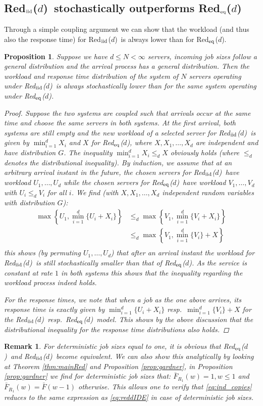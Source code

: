 \documentclass[12pt]{report}
\newcommand{\Redid}{Red$_{\textup{eq}}$($d$)}
\newcommand{\Redind}{Red$_{\textup{iid}}$($d$)}
\newtheorem{remark}{Remark}
\newtheorem{proposition}[theorem]{Proposition}
\begin{document}
\subsection{\Redind\ stochastically outperforms \Redid}
Through a simple coupling argument we can show that the workload (and thus also the response time) for \Redind\ is always lower than for \Redid .
\begin{proposition}
Suppose we have $d\leq N<\infty$ servers, incoming job sizes follow a general distribution and the arrival process has a general distribution. Then the workload and response time distribution of the system of $N$ servers operating under \Redind\ is always stochastically lower than for the same system operating under \Redid .
\begin{proof}
Suppose the two systems are coupled such that arrivals occur at the same time and choose the same servers in both systems. At the first arrival, both systems are still empty and the new workload of a selected server for \Redind\ is given by $\min_{i=1}^d X_i$ and $X$ for \Redid, where $X,X_1,\dots,X_d$ are independent and have distribution $G$. The inequality $\min_{i=1}^d X_i \leq_d X$ obviously holds (where $\leq_d$ denotes the distributional inequality). By induction, we assume that at an arbitrary arrival instant in the future, the chosen servers for \Redind\ have workload $U_1,\dots,U_d$ while the chosen servers for \Redid\ have workload $V_1,\dots,V_d$ with $U_i \leq_d V_i$ for all $i$. We find (with $X,X_1,\dots,X_d$ independent random variables with distribution $G$):
\begin{align*}
\max\left\{U_1, \min_{i=1}^d\{U_i+X_i\} \right\} & \leq_d \max\left\{V_1, \min_{i=1}^d\{V_i+X_i\} \right\}\\
& \leq_d \max\left\{V_1, \min_{i=1}^d\{V_i\} +X \right\}\\
\end{align*}
this shows (by permuting $U_1,\dots,U_d$) that after an arrival instant the workload for \Redind\ is still stochastically smaller than that of \Redid . As the service is constant at rate $1$ in both systems this shows that the inequality regarding the workload process indeed holds.

For the response times, we note that when a job as the one above arrives, its response time is exactly given by $\min_{i=1}^d\{U_i + X_i\}$ resp.~$\min_{i=1}^d\{V_i\}+X$ for the \Redind\ resp.~\Redid\ model. This shows by the above discussion that the distributional inequality for the response time distributions also holds.
\end{proof}
\end{proposition}
\begin{remark}
For deterministic job sizes equal to one, it is obvious that \Redid\ and \Redind\ become equivalent. We can also show this analytically by looking at Theorem \ref{thm:mainRed} and Proposition \ref{prop:gardner}, in Proposition \ref{prop:gardner} we find for deterministic job sizes that: $\bar F_{R_1}(w)=1, w \leq 1$ and $\bar F_{R_1}(w)=\bar F(w-1)$ otherwise. This allows one to verify that \eqref{eq:ind_copies} reduces to the same expression as \eqref{eq:reddIDE} in case of deterministic job sizes.
\end{remark}
\end{document}
